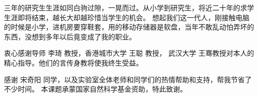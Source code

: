 \begin{acknowledgement}

  三年的研究生生涯如同白驹过隙，一晃而过。从小学到研究生，将近二十年的求学生涯即将结束，越长大却越珍惜当学生的机会。
  想起我们这一代人，刚接触电脑的时候是小学，进机房要穿鞋套，用的移动存储器是软盘，当年不敢乱动怕弄坏的东西，没想到多年以后竟变成了我的职业。

  衷心感谢导师 李琦 教授，香港城市大学 王聪 教授， 武汉大学 王骞教授对本人的精心指导。他们的言传身教将使我终生受益。

  感谢 宋奇阳 同学，以及实验室全体老师和同学们的热情帮助和支持，帮我节省了不少时间。
  本课题承蒙国家自然科学基金资助，特此致谢。

\end{acknowledgement}
